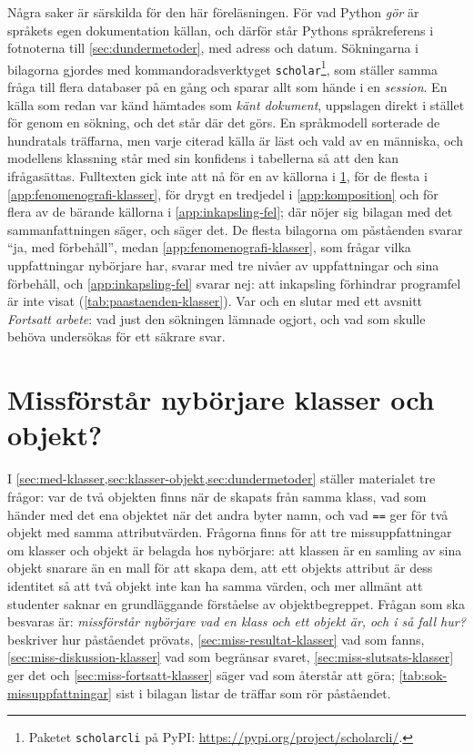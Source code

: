 Några saker är särskilda för den här föreläsningen.  För vad Python
\emph{gör} är språkets egen dokumentation källan, och därför står
Pythons språkreferens i fotnoterna till \cref{sec:dundermetoder}, med
adress och datum.  Sökningarna i bilagorna gjordes med
kommandoradsverktyget \texttt{scholar}\footnote{Paketet
  \texttt{scholarcli} på PyPI:
  \url{https://pypi.org/project/scholarcli/}.}, som ställer samma fråga
till flera databaser på en gång och sparar allt som hände i en
\emph{session}.  En källa som redan var känd hämtades som \emph{känt
dokument}, uppslagen direkt i stället för genom en sökning, och det
står där det görs.  En språkmodell sorterade de hundratals träffarna, men
varje citerad källa är läst och vald av en människa, och modellens
klassning står med sin konfidens i tabellerna så att den kan
ifrågasättas.  Fulltexten gick inte att nå för en av källorna i
\cref{app:missuppfattningar-klasser}, för de flesta i
\cref{app:fenomenografi-klasser}, för drygt en tredjedel i
\cref{app:komposition} och för
flera av de bärande källorna i \cref{app:inkapsling-fel}; där nöjer
sig bilagan
med det sammanfattningen säger, och säger det.  De flesta bilagorna om
påståenden svarar \enquote{ja, med förbehåll}, medan
\cref{app:fenomenografi-klasser}, som frågar vilka uppfattningar
nybörjare har, svarar med tre nivåer av uppfattningar och sina
förbehåll, och \cref{app:inkapsling-fel} svarar nej: att inkapsling
förhindrar programfel är inte visat (\cref{tab:paastaenden-klasser}).
Var och en slutar med ett avsnitt
\emph{Fortsatt arbete}: vad just den sökningen lämnade ogjort, och vad
som skulle behöva undersökas för ett säkrare svar.

\chapter{Missförstår nybörjare klasser och objekt?}
\label{app:missuppfattningar-klasser}

I \cref{sec:med-klasser,sec:klasser-objekt,sec:dundermetoder} ställer
materialet tre frågor: var de två objekten finns när de skapats från
samma klass, vad som händer med det ena objektet när det andra byter
namn, och vad \texttt{==}
ger för två objekt med samma attributvärden.  Frågorna finns för att tre
missuppfattningar om klasser och objekt är belagda hos nybörjare: att
klassen är en samling av sina objekt snarare än en mall för att skapa
dem\autocite{Ragonis2005OOP}, att ett objekts attribut är dess identitet
så att två objekt inte kan ha samma värden\autocite{Holland1997}, och
mer allmänt att studenter saknar en grundläggande förståelse av
objektbegreppet\autocite{Kaczmarczyk2010}.  Frågan som ska besvaras är:
\emph{missförstår nybörjare vad en klass och ett objekt är, och i så
fall hur?}   beskriver hur påståendet prövats,
\cref{sec:miss-resultat-klasser} vad som fanns,
\cref{sec:miss-diskussion-klasser} vad
som begränsar svaret, \cref{sec:miss-slutsats-klasser} ger det och
\cref{sec:miss-fortsatt-klasser} säger vad som återstår att göra;
\cref{tab:sok-missuppfattningar} sist i bilagan listar de träffar som
rör påståendet.

